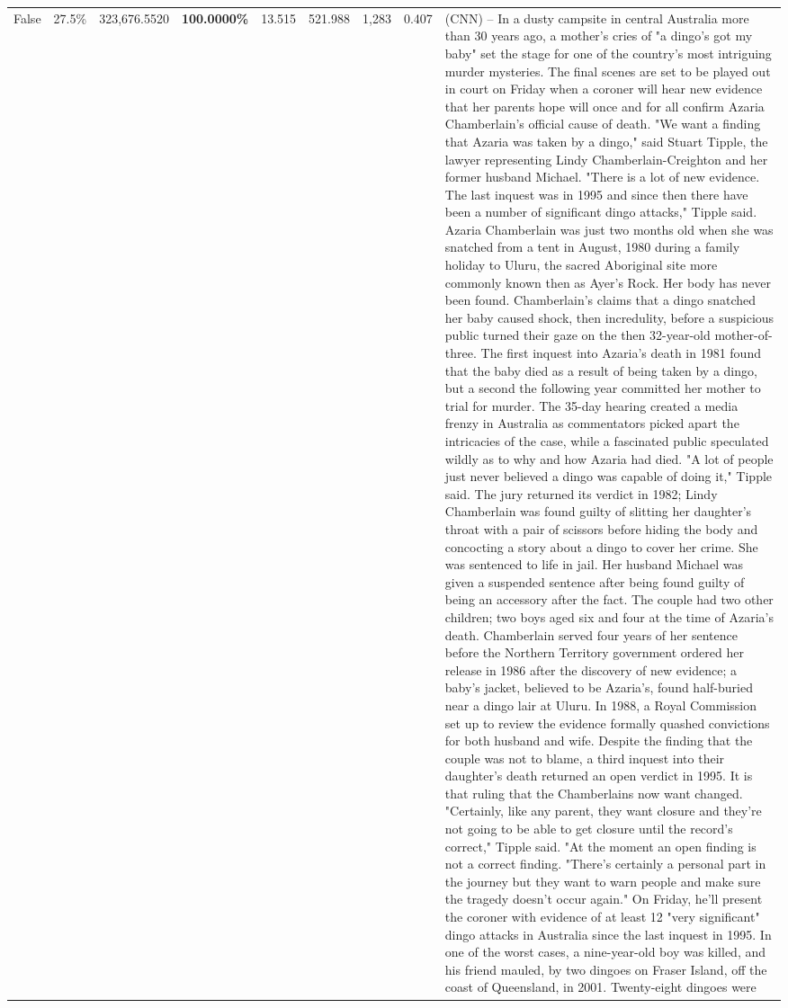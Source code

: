 \begin{table}[H]
\begin{tabular}{lllrlllll}
False & 27.5\% & 323,676.5520 & \bfseries \color{red} 100.0000\% & 13.515 & 521.988 & 1,283 & 0.407 & (CNN) -- In a dusty campsite in central Australia more than 30 years ago, a mother's cries of "a dingo's got my baby" set the stage for one of the country's most intriguing murder mysteries. The final scenes are set to be played out in court on Friday when a coroner will hear new evidence that her parents hope will once and for all confirm Azaria Chamberlain's official cause of death. "We want a finding that Azaria was taken by a dingo," said Stuart Tipple, the lawyer representing Lindy Chamberlain-Creighton and her former husband Michael. "There is a lot of new evidence. The last inquest was in 1995 and since then there have been a number of significant dingo attacks," Tipple said. Azaria Chamberlain was just two months old when she was snatched from a tent in August, 1980 during a family holiday to Uluru, the sacred Aboriginal site more commonly known then as Ayer's Rock. Her body has never been found. Chamberlain's claims that a dingo snatched her baby caused shock, then incredulity, before a suspicious public turned their gaze on the then 32-year-old mother-of-three. The first inquest into Azaria's death in 1981 found that the baby died as a result of being taken by a dingo, but a second the following year committed her mother to trial for murder. The 35-day hearing created a media frenzy in Australia as commentators picked apart the intricacies of the case, while a fascinated public speculated wildly as to why and how Azaria had died. "A lot of people just never believed a dingo was capable of doing it," Tipple said. The jury returned its verdict in 1982; Lindy Chamberlain was found guilty of slitting her daughter's throat with a pair of scissors before hiding the body and concocting a story about a dingo to cover her crime. She was sentenced to life in jail. Her husband Michael was given a suspended sentence after being found guilty of being an accessory after the fact. The couple had two other children; two boys aged six and four at the time of Azaria's death. Chamberlain served four years of her sentence before the Northern Territory government ordered her release in 1986 after the discovery of new evidence; a baby's jacket, believed to be Azaria's, found half-buried near a dingo lair at Uluru. In 1988, a Royal Commission set up to review the evidence formally quashed convictions for both husband and wife. Despite the finding that the couple was not to blame, a third inquest into their daughter's death returned an open verdict in 1995. It is that ruling that the Chamberlains now want changed. "Certainly, like any parent, they want closure and they're not going to be able to get closure until the record's correct," Tipple said. "At the moment an open finding is not a correct finding. "There's certainly a personal part in the journey but they want to warn people and make sure the tragedy doesn't occur again." On Friday, he'll present the coroner with evidence of at least 12 "very significant" dingo attacks in Australia since the last inquest in 1995. In one of the worst cases, a nine-year-old boy was killed, and his friend mauled, by two dingoes on Fraser Island, off the coast of Queensland, in 2001. Twenty-eight dingoes were 
\end{tabular}
\end{table}
